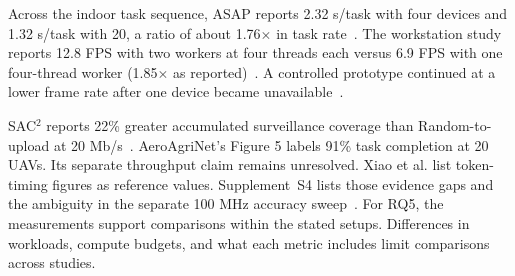 \documentclass[journal]{IEEEtran}
\begin{document}
Across the indoor task sequence, ASAP reports 2.32 s/task with four devices and 1.32 s/task with 20, a ratio of about 1.76$\times$ in task rate~\cite{R0014}. The workstation study reports 12.8 FPS with two workers at four threads each versus 6.9 FPS with one four-thread worker (1.85$\times$ as reported)~\cite{R0125}. A controlled prototype continued at a lower frame rate after one device became unavailable~\cite{R0062}.\par SAC$^2$ reports 22\% greater accumulated surveillance coverage than Random-to-upload at 20 Mb/s~\cite{R0036}. AeroAgriNet's Figure 5 labels 91\% task completion at 20 UAVs. Its separate throughput claim remains unresolved. Xiao et al. list token-timing figures as reference values. Supplement~S4 lists those evidence gaps and the ambiguity in the separate 100 MHz accuracy sweep~\cite{R0090,R0145,R0080}. For RQ5, the measurements support comparisons within the stated setups. Differences in workloads, compute budgets, and what each metric includes limit comparisons across studies.

\end{document}
